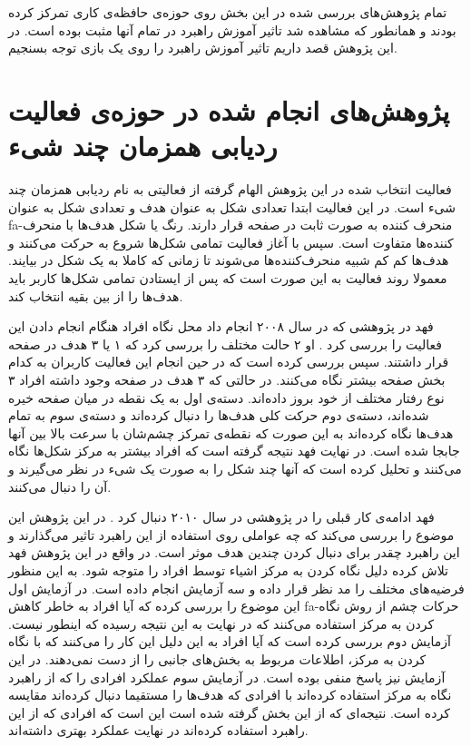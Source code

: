 \documentclass[twoside, a4paper,11pt]{book}
\numberwithin{equation}{chapter}
\numberwithin{table}{chapter}
\numberwithin{figure}{chapter}
\numberwithin{equation}{chapter}
\newcommand{\mls}[1]{\gls{fa-#1}\glsuseri{la-#1}}
\begin{document}
تمام پژوهش‌های بررسی شده در این بخش روی حوزه‌ی حافظه‌ی کاری تمرکز کرده بودند و همانطور که مشاهده شد تاثیر آموزش راهبرد در تمام آنها مثبت بوده است. در این پژوهش قصد داریم تاثیر آموزش راهبرد را روی یک بازی توجه بسنجیم.

\section{پژوهش‌های انجام شده در حوزه‌ی فعالیت ردیابی همزمان چند شیء}
فعالیت انتخاب شده در این پژوهش الهام گرفته از فعالیتی به نام ردیابی همزمان چند شیء است. در این فعالیت ابتدا تعدادی شکل به عنوان هدف و تعدادی شکل به عنوان \mls{منحرف کننده} به صورت ثابت در صفحه قرار دارند. رنگ یا شکل هدف‌ها با منحرف کننده‌ها متفاوت است. سپس با آغاز فعالیت تمامی شکل‌ها شروع به حرکت می‌کنند و هدف‌ها کم کم شبیه منحرف‌کننده‌ها می‌شوند تا زمانی که کاملا به یک شکل در بیایند. معمولا روند فعالیت به این صورت است که پس از ایستادن تمامی شکل‌ها کاربر باید هدف‌ها را از بین بقیه انتخاب کند.

فهد در پژوهشی که در سال ۲۰۰۸ انجام داد محل نگاه افراد هنگام انجام دادن این فعالیت را بررسی کرد \cite{fehd2008whereLook}. او ۲ حالت مختلف را بررسی کرد که ۱ یا ۳ هدف در صفحه قرار داشتند. سپس بررسی کرده است که در حین انجام این فعالیت کاربران به کدام بخش صفحه بیشتر نگاه می‌کنند. در حالتی که ۳ هدف در صفحه وجود داشته افراد ۳ نوع رفتار مختلف از خود بروز داده‌اند. دسته‌ی اول به یک نقطه در میان صفحه خیره شده‌اند، دسته‌ی دوم حرکت کلی هدف‌ها را دنبال کرده‌اند و دسته‌ی سوم به تمام هدف‌ها نگاه کرده‌اند به این صورت که نقطه‌ی تمرکز چشم‌شان با سرعت بالا بین آنها جابجا شده است. در نهایت فهد نتیجه گرفته است که افراد بیشتر به مرکز شکل‌ها نگاه می‌کنند و تحلیل کرده است که آنها چند شکل را به صورت یک شیء در نظر می‌گیرند و آن را دنبال می‌کنند.

فهد ادامه‌ی کار قبلی را در پژوهشی در سال ۲۰۱۰ دنبال کرد \cite{fehd2010centerLook}. در این پژوهش این موضوع را بررسی می‌کند که چه عواملی روی استفاده از این راهبرد تاثیر می‌گذارند و این راهبرد چقدر برای دنبال کردن چندین هدف موثر است. در واقع در این پژوهش فهد تلاش کرده دلیل نگاه کردن به مرکز اشیاء توسط افراد را متوجه شود. به این منظور فرضیه‌های مختلف را مد نظر قرار داده و سه آزمایش انجام داده است. در آزمایش اول این موضوع را بررسی کرده که آیا افراد به خاطر کاهش \mls{حرکات چشم} از روش نگاه کردن به مرکز استفاده می‌کنند که در نهایت به این نتیجه رسیده که اینطور نیست. آزمایش دوم بررسی کرده است که آیا افراد به این دلیل این کار را می‌کنند که با نگاه کردن به مرکز، اطلاعات مربوط به بخش‌های جانبی را از دست نمی‌دهند. در این آزمایش نیز پاسخ منفی بوده است. در آزمایش سوم عملکرد افرادی را که از راهبرد نگاه به مرکز استفاده کرده‌اند با افرادی که هدف‌ها را مستقیما دنبال کرده‌اند مقایسه کرده است. نتیجه‌ای که از این بخش گرفته شده است این است که افرادی که از این راهبرد استفاده کرده‌اند در نهایت عملکرد بهتری داشته‌اند. 
\end{document}
